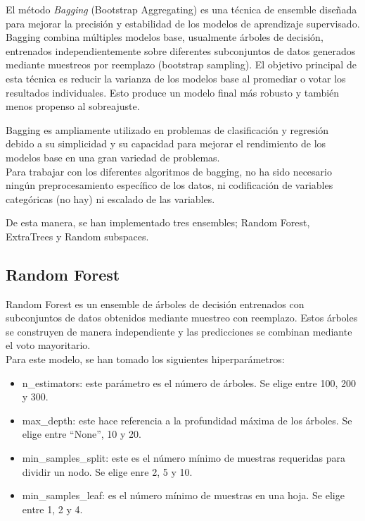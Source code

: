 \documentclass[12pt,letterpaper]{article}
\begin{document}
El método \textit{Bagging} (Bootstrap Aggregating) es una técnica de ensemble diseñada para mejorar la precisión y estabilidad de los modelos de aprendizaje supervisado. Bagging combina múltiples modelos base, usualmente árboles de decisión, entrenados independientemente sobre diferentes subconjuntos de datos generados mediante muestreos por reemplazo (bootstrap sampling). El objetivo principal de esta técnica es reducir la varianza de los modelos base al promediar o votar los resultados individuales. Esto produce un modelo final más robusto y también menos propenso al sobreajuste.

Bagging es ampliamente utilizado en problemas de clasificación y regresión debido a su simplicidad y su capacidad para mejorar el rendimiento de los modelos base en una gran variedad de problemas. \\

Para trabajar con los diferentes algoritmos de bagging, no ha sido necesario ningún preprocesamiento específico de los datos, ni codificación de variables categóricas (no hay) ni escalado de las  variables.

De esta manera, se han implementado tres ensembles; Random Forest, ExtraTrees y Random subspaces.

\subsection{Random Forest}
Random Forest es un ensemble de árboles de decisión entrenados con subconjuntos de datos obtenidos mediante muestreo con reemplazo. Estos árboles se construyen de manera independiente y las predicciones se combinan mediante el voto mayoritario.\\
Para este modelo, se han tomado los siguientes hiperparámetros:
\begin{itemize}
    \item n\_estimators: este parámetro es el número de árboles. Se elige entre 100, 200 y 300.
    \item max\_depth: este hace referencia a la profundidad máxima de los árboles. Se elige entre ``None'', 10 y 20.
    \item min\_samples\_split: este es el número mínimo de muestras requeridas para dividir un nodo. Se elige enre 2, 5 y 10.
    \item min\_samples\_leaf: es el número mínimo de muestras en una hoja. Se elige entre 1, 2 y 4.
\end{itemize}
\end{document}
